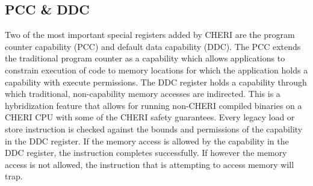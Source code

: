 \subsection{PCC \& DDC}
Two of the most important special registers added by CHERI are the program counter capability (PCC) and default data capability (DDC). The PCC extends the traditional program counter as a capability which allows applications to constrain execution of code to memory locations for which the application holds a capability with execute permissions. The DDC register holds a capability through which traditional, non-capability memory accesses are indirected. This is a hybridization feature that allows for running non-CHERI compiled binaries on a CHERI CPU with some of the CHERI safety guarantees. Every legacy load or store instruction is checked against the bounds and permissions of the capability in the DDC register. If the memory access is allowed by the capability in the DDC register, the instruction completes successfully. If however the memory access is not allowed, the instruction that is attempting to access memory will trap.

